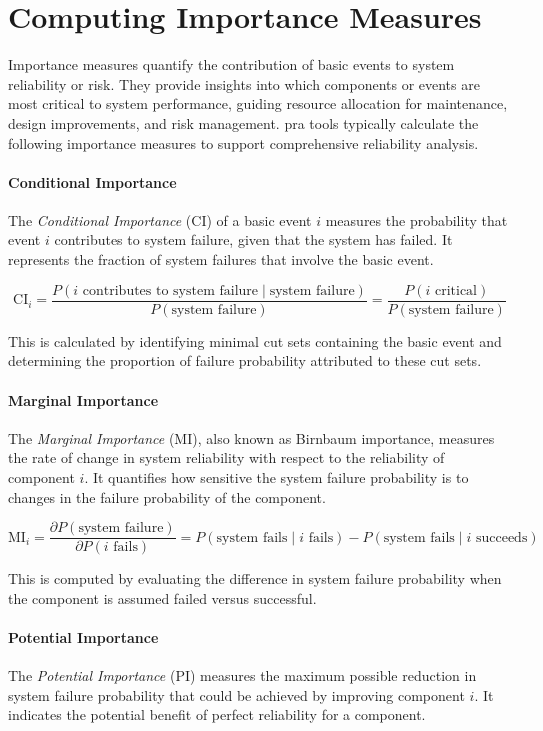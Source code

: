 \section{Computing Importance Measures}

Importance measures quantify the contribution of basic events to system reliability or risk. They provide insights into which components or events are most critical to system performance, guiding resource allocation for maintenance, design improvements, and risk management. \acrshort{pra} tools typically calculate the following importance measures to support comprehensive reliability analysis.

\paragraph{Conditional Importance}
The \emph{Conditional Importance} (CI) of a basic event $i$ measures the probability that event $i$ contributes to system failure, given that the system has failed. It represents the fraction of system failures that involve the basic event.

\[
\text{CI}_i = \frac{P(i \text{ contributes to system failure} \mid \text{system failure})}{P(\text{system failure})} = \frac{P(i \text{ critical})}{P(\text{system failure})}
\]

This is calculated by identifying minimal cut sets containing the basic event and determining the proportion of failure probability attributed to these cut sets.

\paragraph{Marginal Importance}
The \emph{Marginal Importance} (MI), also known as Birnbaum importance, measures the rate of change in system reliability with respect to the reliability of component $i$. It quantifies how sensitive the system failure probability is to changes in the failure probability of the component.

\[
\text{MI}_i = \frac{\partial P(\text{system failure})}{\partial P(i \text{ fails})} = P(\text{system fails} \mid i \text{ fails}) - P(\text{system fails} \mid i \text{ succeeds})
\]

This is computed by evaluating the difference in system failure probability when the component is assumed failed versus successful.

\paragraph{Potential Importance}
The \emph{Potential Importance} (PI) measures the maximum possible reduction in system failure probability that could be achieved by improving component $i$. It indicates the potential benefit of perfect reliability for a component.

